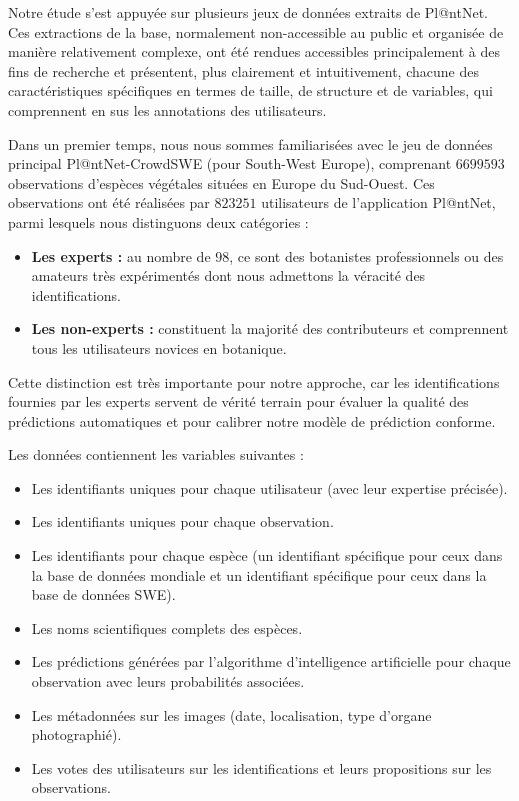 \documentclass[a4paper,12pt]{article}
\begin{document}
Notre étude s'est appuyée sur plusieurs jeux de données extraits de Pl@ntNet. Ces extractions de la base, normalement non-accessible au public et organisée de manière relativement complexe, ont été rendues accessibles principalement à des fins de recherche et présentent, plus clairement et intuitivement, chacune des caractéristiques spécifiques en termes de taille, de structure et de variables, qui comprennent en sus les annotations des utilisateurs.

\vspace{0.2cm}

Dans un premier temps, nous nous sommes familiarisées avec le jeu de données principal Pl@ntNet-CrowdSWE (pour South-West Europe), comprenant $\num{6 699 593}$ observations d'espèces végétales situées en Europe du Sud-Ouest. Ces observations ont été réalisées par $\num{823 251}$ utilisateurs de l'application Pl@ntNet, parmi lesquels nous distinguons deux catégories : 
\begin{itemize}
    \item \textbf{Les experts :} au nombre de $98$, ce sont des botanistes professionnels ou des amateurs très expérimentés dont nous admettons la véracité des identifications.
    \item \textbf{Les non-experts :} constituent la majorité des contributeurs et comprennent tous les utilisateurs novices en botanique.
\end{itemize}

\vspace{0.2cm}

Cette distinction est très importante pour notre approche, car les identifications fournies par les experts servent de vérité terrain pour évaluer la qualité des prédictions automatiques et pour calibrer notre modèle de prédiction conforme.

\vspace{0.2cm}

Les données contiennent les variables suivantes :
\begin{itemize}
    \item Les identifiants uniques pour chaque utilisateur (avec leur expertise précisée).
    \item Les identifiants uniques pour chaque observation.
    \item Les identifiants pour chaque espèce (un identifiant spécifique pour ceux dans la base de données mondiale et un identifiant spécifique pour ceux dans la base de données SWE).
    \item Les noms scientifiques complets des espèces.
    \item Les prédictions générées par l'algorithme d'intelligence artificielle pour chaque observation avec leurs probabilités associées.
    \item Les métadonnées sur les images (date, localisation, type d'organe photographié).
    \item Les votes des utilisateurs sur les identifications et leurs propositions sur les observations.
\end{itemize}
\end{document}
